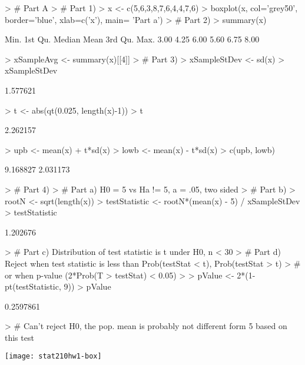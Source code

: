 \documentclass{article}
\begin{document}
\begin{Schunk}
\begin{Sinput}
> # Part A
> # Part 1)
> x <- c(5,6,3,8,7,6,4,4,7,6)
> boxplot(x, col='grey50', border='blue', xlab=c('x'), main= 'Part a')
> # Part 2)
> summary(x)
\end{Sinput}
\begin{Soutput}
   Min. 1st Qu.  Median    Mean 3rd Qu.    Max. 
   3.00    4.25    6.00    5.60    6.75    8.00 
\end{Soutput}
\begin{Sinput}
> xSampleAvg <- summary(x)[[4]]
> # Part 3)
> xSampleStDev <- sd(x)
> xSampleStDev
\end{Sinput}
\begin{Soutput}
[1] 1.577621
\end{Soutput}
\begin{Sinput}
> t <- abs(qt(0.025, length(x)-1))
> t
\end{Sinput}
\begin{Soutput}
[1] 2.262157
\end{Soutput}
\begin{Sinput}
> upb <- mean(x) + t*sd(x)
> lowb <- mean(x) - t*sd(x)
> c(upb, lowb)
\end{Sinput}
\begin{Soutput}
[1] 9.168827 2.031173
\end{Soutput}
\begin{Sinput}
> # Part 4)
>   # Part a) H0 = 5 vs Ha != 5, a = .05, two sided
>   # Part b)
> rootN <- sqrt(length(x))
> testStatistic <- rootN*(mean(x) - 5) / xSampleStDev
> testStatistic
\end{Sinput}
\begin{Soutput}
[1] 1.202676
\end{Soutput}
\begin{Sinput}
>   # Part c) Distribution of test statistic is t under H0, n < 30
>   # Part d) Reject when test statistic is less than Prob(testStat < t), Prob(testStat > t)
>   # or when p-value (2*Prob(T > testStat) < 0.05)
> 
> pValue <- 2*(1-pt(testStatistic, 9))
> pValue
\end{Sinput}
\begin{Soutput}
[1] 0.2597861
\end{Soutput}
\begin{Sinput}
> # Can't reject H0, the pop. mean is probably not different form 5 based on this test
\end{Sinput}
\end{Schunk}
\texttt{[image: stat210hw1-box]}
\end{document}
